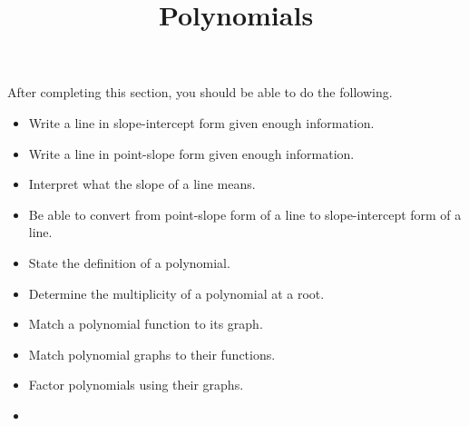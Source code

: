 \documentclass{ximera}
\title{Polynomials}
\begin{document}
\begin{abstract} 
\end{abstract}

\maketitle

\begin{sectionOutcomes}
After completing this section, you should be able to do the following.

\begin{itemize}
	\item Write a line in slope-intercept form given enough information.
    \item Write a line in point-slope form given enough information.
    \item Interpret what the slope of a line means.
    \item Be able to convert from point-slope form of a line to slope-intercept form of a line.
    \item State the definition of a polynomial.
    \item Determine the multiplicity of a polynomial at a root.
    \item Match a polynomial function to its graph.
    \item Match polynomial graphs to their functions.
    \item Factor polynomials using their graphs.
    \item 

\end{itemize}
\end{sectionOutcomes}
\end{document}
